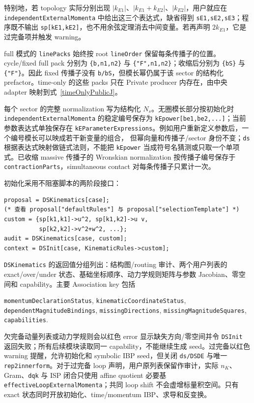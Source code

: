 ﻿\documentclass[a4paper,11pt]{article}
\begin{document}
特别地，若 topology 实际分别出现 $|k_{E1}|$、$|k_{E1}+k_{E2}|$、$|k_{E2}|$，用户就应在 \texttt{independentExternal\allowbreak Momenta} 中给出这三个表达式，缺省得到 \texttt{sE1,sE2,sE3}；程序既不输出 \texttt{sp[kE1,kE2]}，也不用余弦定理消去中间变量。若再声明 $2k_{E1}$，它是过完备项并触发 warning。

full 模式的 \texttt{linePacks} 始终按 root \texttt{lineOrder} 保留每条传播子的位置。cycle/fixed full pack 分别为 \texttt{\{b,n1,n2\}} 与 \texttt{\{"F",n1,n2\}}；收缩后分别为 \texttt{\{bS\}} 与 \texttt{\{"F"\}}。因此 fixed 传播子没有 \texttt{b/bS}，但模长幂仍属于该 sector 的结构化 prefactor。time-only 的这些 packs 只在 Private producer 内存在，由中央 adapter 映射到式~\eqref{timeOnlyPublicJ}。

每个 sector 的完整 normalization 写为结构化 $N_s$。无圈模长部分按初始化时
\texttt{independentExternalMomenta} 的稳定编号保存为
\texttt{kEpower[be1,be2,...]}；当前参数表达式单独保存在
\texttt{kEParameterExpressions}。例如用户重新定义参数后，一个编号模长可以映成若干新变量的组合，
但幂向量和传播子/sector 身份不变；\texttt{ds} 根据表达式映射做链式法则，不能把
\texttt{kEpower} 当成符号名猜测或只取一个单项式。已收缩 massive 传播子的 Wronskian normalization
按传播子编号保存于 \texttt{contractionParts}，simultaneous contact 对每条传播子只累计一次。

初始化采用不阻塞脚本的两阶段接口：
\begin{verbatim}
proposal = DSKinematics[case];
(* 查看 proposal["defaultRules"] 与 proposal["selectionTemplate"] *)
custom = {sp[k1,k1]->u^2, sp[k1,k2]->u v,
          sp[k2,k2]->v^2+w^2, ...};
audit = DSKinematics[case, custom];
context = DSInit[case, KinematicRules->custom];
\end{verbatim}
\texttt{DSKinematics} 的返回值分组列出：结构图/routing 审计、两个用户列表的 exact/over/under 状态、基础坐标顺序、动力学规则矩阵与参数 Jacobian、零空间和 capability。主要 Association key 包括
\begin{center}
\texttt{momentumDeclaration\allowbreak Status},
\texttt{kinematicCoordinate\allowbreak Status},
\texttt{dependentMagnitudeBindings},
\texttt{missingDirections},
\texttt{missingMagnitudeSquares},
\texttt{capabilities}.
\end{center}
欠完备动量列表或动力学规则会以红色 error 显示缺失方向/零空间并令 \texttt{DSInit} 返回失败；所有后续模块读取同一 capability，不能继续生成 seed。过完备以红色 warning 提醒，允许初始化和 symbolic IBP seed，但关闭 \texttt{ds/DSDE} 与唯一 \texttt{rep2innerform}。对于过完备 loop 声明，用户原列表保留作审计，实际 $n_K$、Gram、\texttt{dqk} 与 ISP 闭合只使用 affine quotient 必要基 \texttt{effectiveLoopExternalMomenta}；共同 loop shift 不会虚增标量积空间。只有 exact 状态同时开放初始化、time/momentum IBP、求导和反变换。
\end{document}
